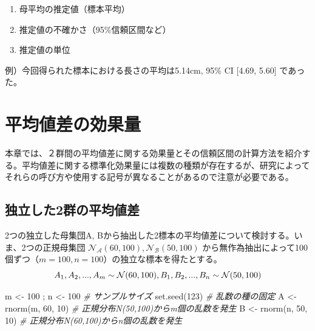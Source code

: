 \documentclass[
  ja=standard, xelatex, base=12pt]{bxjsreport}
\newenvironment{Shaded}{\begin{snugshade}}{\end{snugshade}}
\newcommand{\CommentTok}[1]{\textcolor[rgb]{0.56,0.35,0.01}{\textit{#1}}}
\newcommand{\DecValTok}[1]{\textcolor[rgb]{0.00,0.00,0.81}{#1}}
\newcommand{\FunctionTok}[1]{\textcolor[rgb]{0.00,0.00,0.00}{#1}}
\newcommand{\NormalTok}[1]{#1}
\newcommand{\OtherTok}[1]{\textcolor[rgb]{0.56,0.35,0.01}{#1}}
\begin{document}
\begin{enumerate}
\def\labelenumi{\arabic{enumi}.}
\item
  母平均の推定値（標本平均）
\item
  推定値の不確かさ（95\%信頼区間など）
\item
  推定値の単位
\end{enumerate}

例）今回得られた標本における長さの平均は5.14cm, 95\% CI {[}4.69, 5.60{]} であった。

\hypertarget{ux5e73ux5747ux5024ux5deeux306eux52b9ux679cux91cf}{%
\chapter{平均値差の効果量}\label{ux5e73ux5747ux5024ux5deeux306eux52b9ux679cux91cf}}

本章では、２群間の平均値差に関する効果量とその信頼区間の計算方法を紹介する。平均値差に関する標準化効果量には複数の種類が存在するが、研究によってそれらの呼び方や使用する記号が異なることがあるので注意が必要である。

\hypertarget{ux72ecux7acbux3057ux305f2ux7fa4ux306eux5e73ux5747ux5024ux5dee}{%
\section{独立した2群の平均値差}\label{ux72ecux7acbux3057ux305f2ux7fa4ux306eux5e73ux5747ux5024ux5dee}}

2つの独立した母集団A, Bから抽出した2標本の平均値差について検討する。いま、2つの正規母集団 \(\mathcal{N_A}(60, 100), \mathcal{N_B}(50, 100)\) から無作為抽出によって100個ずつ（\(m=100, n=100\)）の独立な標本を得たとする。\[
A_1, A_2, ..., A_{m} \sim \mathcal{N}(60, 100),\\
B_1, B_2, ..., B_{n} \sim \mathcal{N}(50, 100)
\]

\begin{Shaded}
\begin{Highlighting}[]
\NormalTok{m }\OtherTok{\textless{}{-}} \DecValTok{100}\NormalTok{ ; n }\OtherTok{\textless{}{-}} \DecValTok{100}   \CommentTok{\# サンプルサイズ}
\FunctionTok{set.seed}\NormalTok{(}\DecValTok{123}\NormalTok{)         }\CommentTok{\# 乱数の種の固定}
\NormalTok{A }\OtherTok{\textless{}{-}} \FunctionTok{rnorm}\NormalTok{(m, }\DecValTok{60}\NormalTok{, }\DecValTok{10}\NormalTok{) }\CommentTok{\# 正規分布N(50,100)からm個の乱数を発生}
\NormalTok{B }\OtherTok{\textless{}{-}} \FunctionTok{rnorm}\NormalTok{(n, }\DecValTok{50}\NormalTok{, }\DecValTok{10}\NormalTok{) }\CommentTok{\# 正規分布N(60,100)からn個の乱数を発生}
\end{Highlighting}
\end{Shaded}
\end{document}
